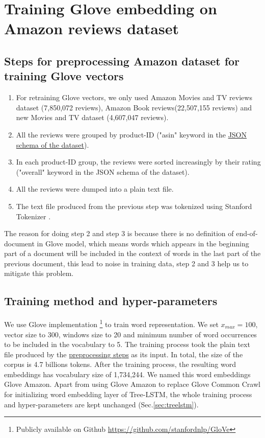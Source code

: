 \hypertarget{sec:Glove-Amazon}{\section{Training Glove embedding on Amazon reviews dataset}}
\label{sec:gloveamazone}
\subsection{Steps for preprocessing Amazon dataset for training Glove vectors}
\label{sec:preprocessamazonglove}
\begin{enumerate}
\item For retraining Glove vectors, we only used Amazon Movies and TV reviews dataset (7,850,072 reviews)\cite{mcauley2013hidden}, Amazon Book reviews(22,507,155 reviews) and new Movies and TV dataset (4,607,047 reviews)\cite{McAuleyTSH15}\cite{HeM16}.
\item All the reviews were grouped by product-ID ("asin" keyword in the \hyperref[sec:amazon]{JSON schema of the dataset}). 
\item In each product-ID group, the reviews were sorted increasingly by their rating ("overall" keyword in the JSON schema of the dataset).
\item All the reviews were dumped into a plain text file.
\item The text file produced from the previous step was tokenized using Stanford Tokenizer \cite{tokenizerpart}. 
\end{enumerate}
The reason for doing step 2 and step 3 is because there is no definition of end-of-document in Glove model, which means words which appears in the beginning part of a document will be included in the context of words in the last part of the previous document, this lead to noise in training data, step 2 and 3 help us to mitigate this problem. 

\subsection{Training method and hyper-parameters}
We use Glove implementation \footnote{Publicly available on Github \url{https://github.com/stanfordnlp/GloVe}} to train word representation. 
We set $x_{max} = 100$, vector size to 300, windows size to 20 and minimum number of word occurrences to be included in the vocabulary to  5.
The training process took the plain text file produced by the \hyperref[sec:preprocessamazonglove]{preprocessing steps} as its input. 
In total, the size of the corpus is 4.7 billions tokens. 
After the training process, the resulting word embeddings has vocabulary size of 1,734,244.
We named this word embeddings Glove Amazon. 
Apart from using Glove Amazon to replace Glove Common Crawl for initializing word embedding layer of Tree-LSTM, the whole training process and hyper-parameters are kept unchanged (Sec.\ref{sec:treelstm}).

